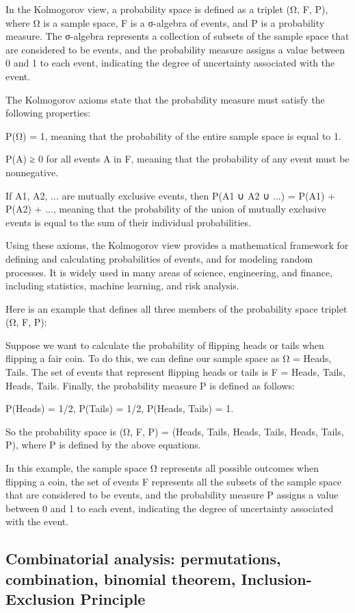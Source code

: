 \documentclass[12pt, a4paper, oneside]{article}
\begin{document}
In the Kolmogorov view, a probability space is defined as a triplet (Ω, F, P), where Ω is a sample space, F is a σ-algebra of events, and P is a probability measure. The σ-algebra represents a collection of subsets of the sample space that are considered to be events, and the probability measure assigns a value between 0 and 1 to each event, indicating the degree of uncertainty associated with the event.

The Kolmogorov axioms state that the probability measure must satisfy the following properties:

P(Ω) = 1, meaning that the probability of the entire sample space is equal to 1.

P(A) ≥ 0 for all events A in F, meaning that the probability of any event must be nonnegative.

If A1, A2, ... are mutually exclusive events, then P(A1 ∪ A2 ∪ ...) = P(A1) + P(A2) + ..., meaning that the probability of the union of mutually exclusive events is equal to the sum of their individual probabilities.

Using these axioms, the Kolmogorov view provides a mathematical framework for defining and calculating probabilities of events, and for modeling random processes. It is widely used in many areas of science, engineering, and finance, including statistics, machine learning, and risk analysis.

Here is an example that defines all three members of the probability space triplet (Ω, F, P):

Suppose we want to calculate the probability of flipping heads or tails when flipping a fair coin. To do this, we can define our sample space as Ω = {Heads, Tails}. The set of events that represent flipping heads or tails is F = {{Heads}, {Tails}, {Heads, Tails}}. Finally, the probability measure P is defined as follows:

P({Heads}) = 1/2,
P({Tails}) = 1/2,
P({Heads, Tails}) = 1.

So the probability space is (Ω, F, P) = ({Heads, Tails}, {{Heads}, {Tails}, {Heads, Tails}}, P), where P is defined by the above equations.

In this example, the sample space Ω represents all possible outcomes when flipping a coin, the set of events F represents all the subsets of the sample space that are considered to be events, and the probability measure P assigns a value between 0 and 1 to each event, indicating the degree of uncertainty associated with the event.
\subsection{ Combinatorial analysis: permutations, combination, binomial theorem, Inclusion-Exclusion Principle }
\end{document}
